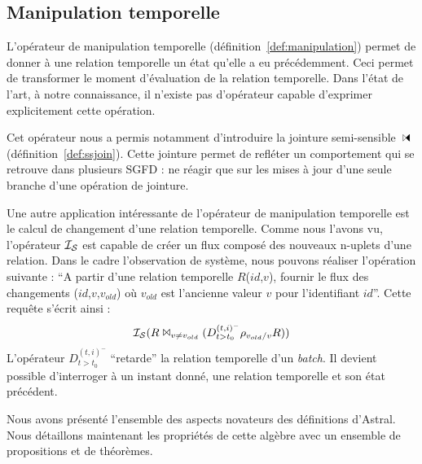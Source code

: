 \subsection{Manipulation temporelle}
L'opérateur de manipulation temporelle (définition~\ref{def:manipulation}) permet de donner à une relation temporelle un état qu'elle a eu précédemment. Ceci permet de transformer le moment d'évaluation de la relation temporelle. Dans l'état de l'art, à notre connaissance, il n'existe pas d'opérateur capable d'exprimer explicitement cette opération.

Cet opérateur nous a permis notamment d'introduire la jointure semi-sensible $\ssjoin$ (définition~\ref{def:ssjoin}). Cette jointure permet de refléter un comportement qui se retrouve dans plusieurs SGFD : ne réagir que sur les mises à jour d'une seule branche d'une opération de jointure.

Une autre application intéressante de l'opérateur de manipulation temporelle est le calcul de changement d'une relation temporelle. Comme nous l'avons vu, l'opérateur $\mathcal{I_S}$ est capable de créer un flux composé des nouveaux n-uplets d'une relation. Dans le cadre l'observation de système, nous pouvons réaliser l'opération suivante : \enquote{A partir d'une relation temporelle $R$($id$,$v$), fournir le flux des changements ($id$,$v$,$v_{old}$) où $v_{old}$ est l'ancienne valeur $v$ pour l'identifiant $id$}. Cette requête s'écrit ainsi :
$$\mathcal{I_S}(R \Join_{v\neq v_{old}} (D^{(t,i)^-}_{t>t_0}\rho_{v_{old}/v} R))$$
L'opérateur $D^{(t,i)^-}_{t>t_0}$ \enquote{retarde} la relation temporelle d'un \textit{batch}. Il devient possible d'interroger à un instant donné, une relation temporelle et son état précédent.

Nous avons présenté l'ensemble des aspects novateurs des définitions d'Astral. Nous détaillons maintenant les propriétés de cette algèbre avec un ensemble de propositions et de théorèmes.
